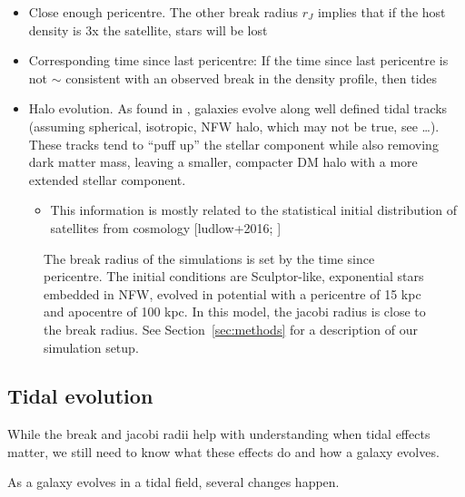 \begin{itemize}
\tightlist
\item
  Close enough pericentre. The other break radius \(r_J\) implies that
  if the host density is 3x the satellite, stars will be lost
\item
  Corresponding time since last pericentre: If the time since last
  pericentre is not \(\sim\) consistent with an observed break in the
  density profile, then tides
\item
  Halo evolution. As found in \citet{EN2021}, galaxies evolve along well
  defined tidal tracks (assuming spherical, isotropic, NFW halo, which
  may not be true, see \ldots). These tracks tend to ``puff up'' the
  stellar component while also removing dark matter mass, leaving a
  smaller, compacter DM halo with a more extended stellar component.

  \begin{itemize}
  \tightlist
  \item
    This information is mostly related to the statistical initial
    distribution of satellites from cosmology {[}ludlow+2016;
    \citet{fattahi+2018}{]}
  \end{itemize}
\end{itemize}

\begin{figure}
\centering
{}
\caption[Break radius validation]{The break radius of the simulations is
set by the time since pericentre. The initial conditions are
Sculptor-like, exponential stars embedded in NFW, evolved in
\citet{EP2020} potential with a pericentre of 15 kpc and apocentre of
100 kpc. In this model, the jacobi radius is close to the break radius.
See Section~\ref{sec:methods} for a description of our simulation
setup.}\label{fig:idealized_break_radius}
\end{figure}

\subsection{Tidal evolution}\label{tidal-evolution}

While the break and jacobi radii help with understanding when tidal
effects matter, we still need to know what these effects do and how a
galaxy evolves.

As a galaxy evolves in a tidal field, several changes happen.

